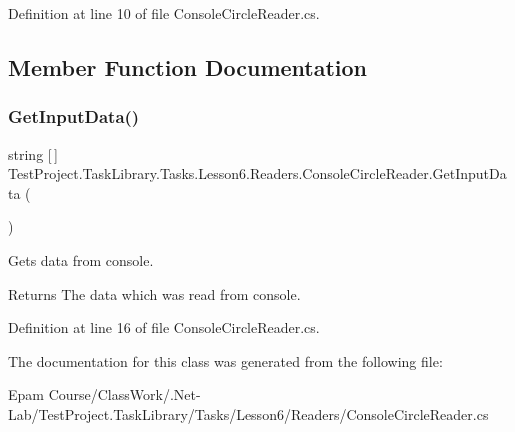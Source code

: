 Definition at line 10 of file Console\+Circle\+Reader.\+cs.



\subsection{Member Function Documentation}
\mbox{\label{class_test_project_1_1_task_library_1_1_tasks_1_1_lesson6_1_1_readers_1_1_console_circle_reader_ad0d41c4bd3a2294413188932318f2fd5}} 
\subsubsection{\texorpdfstring{GetInputData()}{GetInputData()}}
{\footnotesize\ttfamily string \mbox{[}$\,$\mbox{]} Test\+Project.\+Task\+Library.\+Tasks.\+Lesson6.\+Readers.\+Console\+Circle\+Reader.\+Get\+Input\+Data (\begin{DoxyParamCaption}{ }\end{DoxyParamCaption})}



Gets data from console. 

\begin{DoxyReturn}{Returns}
The data which was read from console.
\end{DoxyReturn}


Definition at line 16 of file Console\+Circle\+Reader.\+cs.



The documentation for this class was generated from the following file\+:\begin{DoxyCompactItemize}
\item 
Epam Course/\+Class\+Work/.\+Net-\/\+Lab/\+Test\+Project.\+Task\+Library/\+Tasks/\+Lesson6/\+Readers/Console\+Circle\+Reader.\+cs\end{DoxyCompactItemize}
